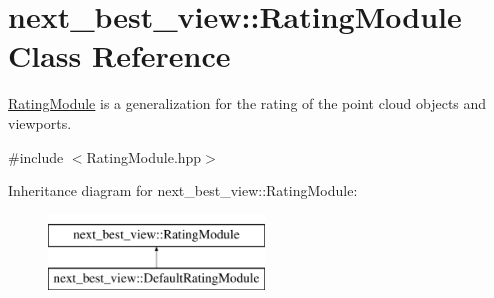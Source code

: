 \hypertarget{classnext__best__view_1_1RatingModule}{\section{next\-\_\-best\-\_\-view\-:\-:\-Rating\-Module \-Class \-Reference}
\label{classnext__best__view_1_1RatingModule}
}


\hyperlink{classnext__best__view_1_1RatingModule}{\-Rating\-Module} is a generalization for the rating of the point cloud objects and viewports.  




{\ttfamily \#include $<$\-Rating\-Module.\-hpp$>$}

\-Inheritance diagram for next\-\_\-best\-\_\-view\-:\-:\-Rating\-Module\-:\begin{figure}[H]
\begin{center}
\leavevmode
\includegraphics[height=2.000000cm]{classnext__best__view_1_1RatingModule}
\end{center}
\end{figure}
